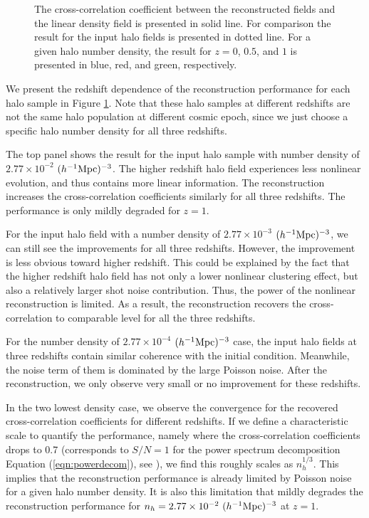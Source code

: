 \documentclass[iop]{emulateapj}
\newcommand{\mpch}{h^{-1} {\rm Mpc}}
\begin{document}
{%
\begin{figure}
\epsfxsize=8.5cm
\caption{The cross-correlation coefficient between the reconstructed fields and the linear density field is presented in solid line.
For comparison the result for the input halo fields is presented in dotted line.
For a given halo number density, the result for $z=0$, $0.5$, and $1$ is presented in blue, red, and green, respectively.}
\label{fig:numevo}
\end{figure}

We present the redshift dependence of the reconstruction performance for each halo sample in Figure \ref{fig:numevo}.
Note that these halo samples at different redshifts are not the same halo population at different cosmic epoch, since we just choose a specific halo number density for all three redshifts.

The top panel shows the result for the input halo sample with number density of $2.77\times 10^{-2}$ $(\mpch)^{-3}$. 
The higher redshift halo field experiences less nonlinear evolution, and thus contains more linear information.
The reconstruction increases the cross-correlation coefficients similarly for all three redshifts.
The performance is only mildly degraded for $z=1$.

For the input halo field with a number density of $2.77\times 10^{-3}$ $(\mpch)^{-3}$, we can still see the improvements for all three redshifts.
However, the improvement is less obvious toward higher redshift.
This could be explained by the fact that the higher redshift halo field has not only a lower nonlinear clustering effect, but also a relatively larger shot noise contribution.
Thus, the power of the nonlinear reconstruction is limited.
As a result, the reconstruction recovers the cross-correlation to comparable level for all the three redshifts.

For the number density of $2.77\times 10^{-4}$ $(\mpch)^{-3}$ case, the input halo fields at three redshifts contain similar coherence with the initial condition.
Meanwhile, the noise term of them is dominated by the large Poisson noise.
After the reconstruction, we only observe very small or no improvement for these redshifts.

In the two lowest density case, we observe the convergence for the recovered cross-correlation coefficients for different redshifts.
If we define a characteristic scale to quantify the performance, namely where the cross-correlation coefficients drops to 0.7 (corresponds to $S/N=1$ for the power spectrum decomposition Equation (\ref{eqn:powerdecom}), see \cite{zhuhm16a}),   
we find this roughly scales as $n_h^{1/3}$.
This implies that the reconstruction performance is already limited by Poisson noise for a given halo number density.
It is also this limitation that mildly degrades the reconstruction performance for $n_h=2.77\times 10^{-2}\ (\mpch)^{-3}$ at $z=1$.


}
\end{document}
